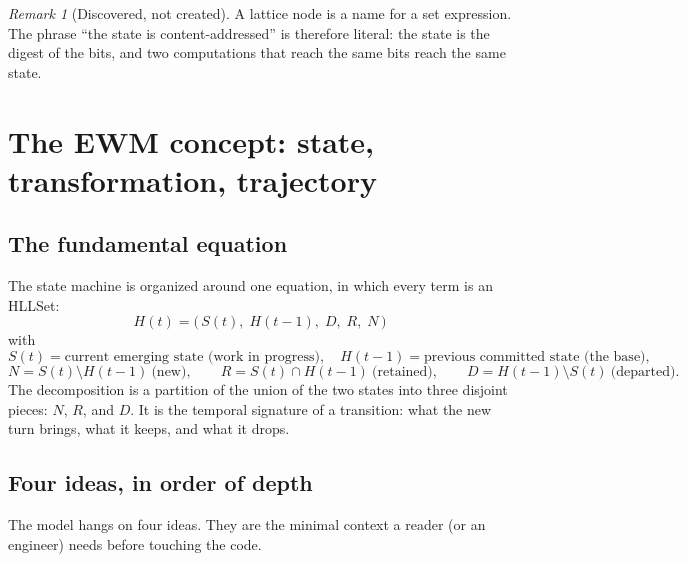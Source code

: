 \documentclass[11pt,a4paper]{article}
\theoremstyle{remark}
\newtheorem{remark}[principle]{Remark}
\begin{document}
\begin{remark}[Discovered, not created]
A lattice node is a name for a set expression. The phrase ``the state is
content-addressed'' is therefore literal: the state is the digest of the bits,
and two computations that reach the same bits reach the same state.
\end{remark}

\section{The EWM concept: state, transformation, trajectory}
\label{sec:ewm}

\subsection{The fundamental equation}

The state machine is organized around one equation, in which every term is an
HLLSet:
\begin{equation}
\label{eq:fundamental}
\boxed{\;H(t) = \bigl(\,S(t),\; H(t{-}1),\; D,\; R,\; N\,\bigr)\;}
\end{equation}
with
\[
S(t) = \text{current emerging state (work in progress)},\quad
H(t{-}1) = \text{previous committed state (the base)},
\]
\[
N = S(t)\setminus H(t{-}1)\ \text{(new)},\qquad
R = S(t)\cap H(t{-}1)\ \text{(retained)},\qquad
D = H(t{-}1)\setminus S(t)\ \text{(departed)}.
\]
The decomposition is a partition of the union of the two states into three
disjoint pieces: $N$, $R$, and $D$. It is the temporal signature of a
transition: what the new turn brings, what it keeps, and what it drops.

\subsection{Four ideas, in order of depth}

The model hangs on four ideas. They are the minimal context a reader (or an
engineer) needs before touching the code.
\end{document}
